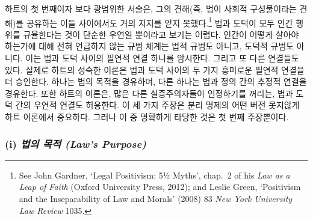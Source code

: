 \documentclass[12pt, oneside]{book}  %
\begin{document}
하트의 첫 번째이자 보다 광범위한 서술은, 그의 견해(즉, 법이 사회적
구성물이라는 견해)를 공유하는 이들 사이에서도 거의 지지를 얻지
못했다.\footnote{See John Gardner, `Legal Positivism: 5½ Myths', chap.~2
  of his \emph{Law as a Leap of Faith} (Oxford University Press, 2012);
  and Leslie Green, `Positivism and the Inseparability of Law and
  Morals' (2008) 83 \emph{New York University Law Review} 1035.} 법과
도덕이 모두 인간 행위를 규율한다는 것이 단순한 우연일 뿐이라고 보기는
어렵다. 인간이 어떻게 살아야 하는가에 대해 전혀 언급하지 않는 규범
체계는 법적 규범도 아니고, 도덕적 규범도 아니다. 이는 법과 도덕 사이의
필연적 연결 하나를 암시한다. 그리고 또 다른 연결들도 있다. 실제로 하트의
성숙한 이론은 법과 도덕 사이의 두 가지 흥미로운 필연적 연결을 더
승인한다. 하나는 법의 목적을 경유하며, 다른 하나는 법과 정의 간의 추정적
연결을 경유한다. 또한 하트의 이론은, 많은 다른 실증주의자들이 인정하기를
꺼리는, 법과 도덕 간의 우연적 연결도 허용한다. 이 세 가지 주장은 분리
명제의 어떤 버전 못지않게 하트 이론에서 중요하다. 그러나 이 중 명확하게
타당한 것은 첫 번째 주장뿐이다.

\subsubsection{\texorpdfstring{(i) \emph{법의 목적 (Law's
Purpose)}}{(i) 법의 목적 (Law's Purpose)}}\label{i-uxbc95uxc758-uxbaa9uxc801-laws-purpose}
\end{document}
